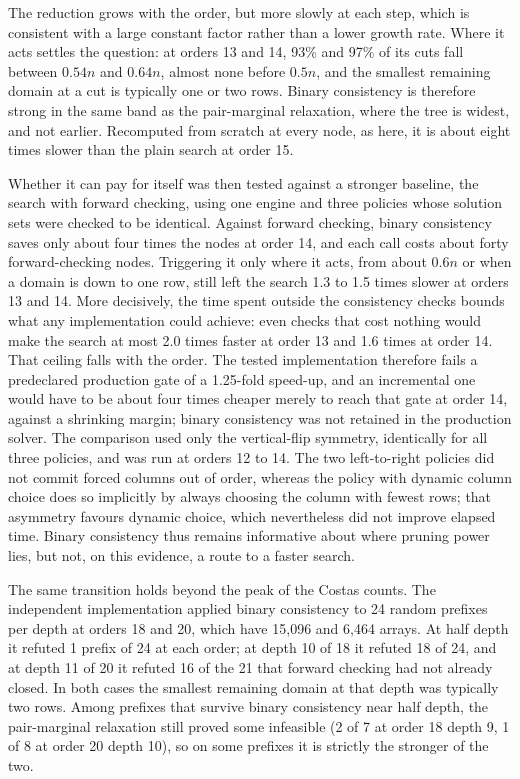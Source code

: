 \documentclass[11pt,a4paper,oneside]{report}
\theoremstyle{definition}
\begin{document}
\noindent The reduction grows with the order, but more slowly at each step, which is consistent with a large
constant factor rather than a lower growth rate. Where it acts settles the question: at orders 13 and 14,
93\% and 97\% of its cuts fall between $0.54n$ and $0.64n$, almost none before $0.5n$, and the smallest
remaining domain at a cut is typically one or two rows. Binary consistency is therefore strong in the
same band as the pair-marginal relaxation, where the tree is widest, and not earlier. Recomputed from
scratch at every node, as here, it is about eight times slower than the plain search at order 15.

Whether it can pay for itself was then tested against a stronger baseline, the search with forward
checking, using one engine and three policies whose solution sets were checked to be identical. Against
forward checking, binary consistency saves only about four times the nodes at order 14, and each call
costs about forty forward-checking nodes. Triggering it only where it acts, from about $0.6n$ or when a
domain is down to one row, still left the search 1.3 to 1.5 times slower at orders 13 and 14. More
decisively, the time spent outside the consistency checks bounds what any implementation could achieve:
even checks that cost nothing would make the search at most 2.0 times faster at order 13 and 1.6 times at
order 14. That ceiling falls with the order. The tested implementation therefore fails a predeclared
production gate of a 1.25-fold speed-up, and an incremental one would have to be about four times cheaper
merely to reach that gate at order 14, against a shrinking margin; binary consistency was not retained in
the production solver. The comparison used only the vertical-flip symmetry, identically for all three
policies, and was run at orders 12 to 14. The two left-to-right policies did not commit forced columns out
of order, whereas the policy with dynamic column choice does so implicitly by always choosing the column
with fewest rows; that asymmetry favours dynamic choice, which nevertheless did not improve elapsed time.
Binary consistency thus remains informative about where pruning power lies, but not, on this evidence, a
route to a faster search.

The same transition holds beyond the peak of the Costas counts. The independent implementation applied
binary consistency to 24 random prefixes per depth at orders 18 and 20, which have 15{,}096 and 6{,}464
arrays. At half depth it refuted 1 prefix of 24 at each order; at depth 10 of 18 it refuted 18 of 24, and at
depth 11 of 20 it refuted 16 of the 21 that forward checking had not already closed. In both cases the
smallest remaining domain at that depth was typically two rows. Among prefixes that survive binary
consistency near half depth, the pair-marginal relaxation still proved some infeasible (2 of 7 at order 18
depth 9, 1 of 8 at order 20 depth 10), so on some prefixes it is strictly the stronger of the two.
\end{document}

